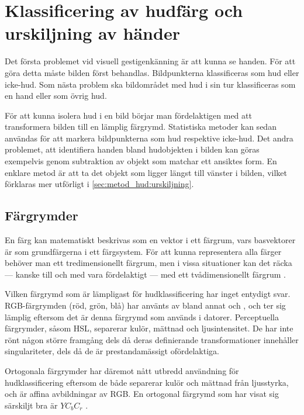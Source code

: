 \documentclass[../rapport_MVEX01-11-05]{subfiles}
\begin{document}
\section{Klassificering av hudfärg och urskiljning av händer}\label{sec:hudklassificering}
Det första problemet vid visuell gestigenkänning är att kunna se handen.
För att göra detta
måste bilden först behandlas. Bildpunkterna klassificeras som hud eller
icke-hud. Som nästa problem ska bildområdet med hud i sin tur klassificeras som
en hand eller som övrig hud.

För att kunna isolera hud i en bild börjar man fördelaktigen med
att transformera bilden till en
lämplig färgrymd. Statistiska metoder kan sedan användas för att
markera bildpunkterna som hud respektive icke-hud.
Det andra problemet, att identifiera handen bland hudobjekten i bilden kan göras
exempelvis genom subtraktion av objekt som matchar ett ansiktes form. En enklare
metod är att ta det objekt som ligger längst till vänster i bilden, vilket
förklaras mer utförligt i \ref{sec:metod_hud:urskiljning}.

\subsection{Färgrymder}\label{sec:klassificering:fargrymder}
En färg kan matematiskt beskrivas som en vektor i ett färgrum, vars
basvektorer är som grundfärgerna i ett färgsystem.
För att kunna representera alla färger
behöver man ett tredimensionellt färgrum, men i vissa situationer kan
det räcka --- kanske till och med vara fördelaktigt --- med ett
tvådimensionellt färgrum \cite{Kakumanu07}.

Vilken färgrymd som är lämpligast för hudklassificering har inget
entydigt svar.
RGB-färgrymden (röd, grön, blå) har använts av bland annat
 och , och ter sig lämplig
eftersom det är denna färgrymd som används i datorer. Perceptuella
färgrymder, såsom HSL, separerar kulör, mättnad och ljusintensitet.
De har inte rönt någon större framgång dels då deras definierande
transformationer innehåller singulariteter, dels då de är
prestandamässigt ofördelaktiga.

Ortogonala färgrymder har däremot nått utbredd användning för
hudklassificering \cite{Hsu02,Elmezain08,Hassanpour08} eftersom de
både separerar kulör och mättnad från ljusstyrka, och är affina avbildningar av
RGB. 
En ortogonal färgrymd som har visat sig särskiljt bra är $YC_bC_r$ \cite{Kakumanu07}.
\end{document}
